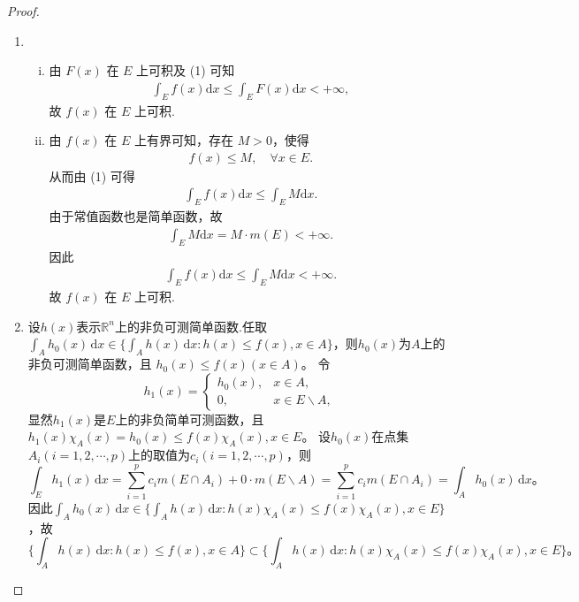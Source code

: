 \documentclass[../../main.tex]{subfiles}
\begin{document}
\begin{proof}
\begin{enumerate}[(1)]
\item \begin{enumerate}[(i)]
\item 由 \(F(x)\) 在 \(E\) 上可积及 (1) 可知
\begin{align*}
\int_E{f(x)\mathrm{d}x}\leqslant \int_E{F(x)\mathrm{d}x}<+\infty,
\end{align*}
故 \(f(x)\) 在 \(E\) 上可积.

\item 由 \(f(x)\) 在 \(E\) 上有界可知，存在 \(M>0\)，使得
\begin{align*}
f(x)\leqslant M,\quad \forall x\in E.
\end{align*}
从而由 (1) 可得
\begin{align*}
\int_E{f(x)\mathrm{d}x}\leqslant \int_E{M\mathrm{d}x}.
\end{align*}
由于常值函数也是简单函数，故
\begin{align*}
\int_E{M\mathrm{d}x}=M\cdot m(E)<+\infty.
\end{align*}
因此
\begin{align*}
\int_E{f(x)\mathrm{d}x}\leqslant \int_E{M\mathrm{d}x}<+\infty.
\end{align*}
故 \(f(x)\) 在 \(E\) 上可积.
\end{enumerate}

\item 设$h(x)$表示$\mathbb{R}^n$上的非负可测简单函数.任取$\int_A h_0(x)\,\mathrm{d}x \in \{\int_A h(x)\,\mathrm{d}x : h(x) \leqslant f(x), x \in A\}$，则$h_0(x)$为$A$上的非负可测简单函数，且
$h_0(x) \leqslant f(x) (x\in A)$。
令
\[
h_1(x) = 
\begin{cases} 
h_0(x), & x \in A, \\
0, & x \in E\backslash A,
\end{cases}
\]
显然$h_1(x)$是$E$上的非负简单可测函数，且
$h_1(x) \chi_A(x) = h_0(x) \leqslant f(x) \chi_A(x), x \in E$。
设$h_0(x)$在点集$A_i (i = 1,2,\cdots,p)$上的取值为$c_i (i = 1,2,\cdots,p)$，则
\[
\int_E h_1(x)\,\mathrm{d}x = \sum_{i=1}^p c_i m(E \cap A_i) + 0 \cdot m(E\backslash A) = \sum_{i=1}^p c_i m(E \cap A_i) = \int_A h_0(x)\,\mathrm{d}x。
\]
因此$\int_A h_0(x)\,\mathrm{d}x \in \{\int_A h(x)\,\mathrm{d}x : h(x) \chi_A(x) \leqslant f(x) \chi_A(x), x \in E\}$，故
\[
\{\int_A h(x)\,\mathrm{d}x : h(x) \leqslant f(x), x \in A\} \subset \{\int_A h(x)\,\mathrm{d}x : h(x) \chi_A(x) \leqslant f(x) \chi_A(x), x \in E\}。
\]


\end{enumerate}
\end{proof}
\end{document}

